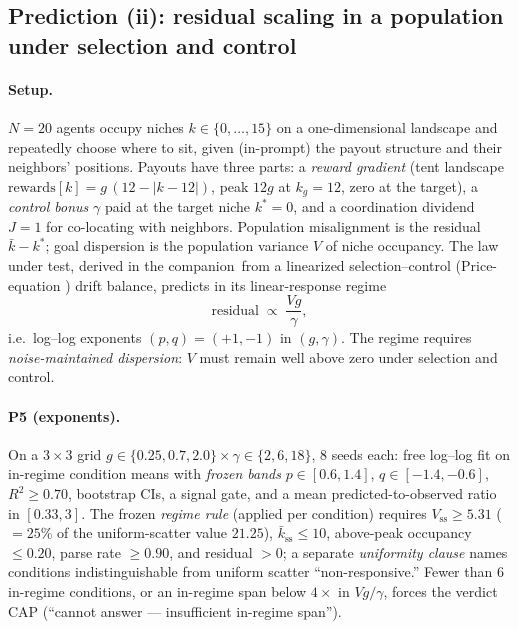 \documentclass{article} %
\newif\ifanon
\begin{document}
\subsection{Prediction (ii): residual scaling in a population under selection and control}
\label{sec:pred-ii}

\paragraph{Setup.} $N = 20$ agents occupy niches $k \in \{0,\dots,15\}$ on a one-dimensional landscape and repeatedly choose where to sit, given (in-prompt) the payout structure and their neighbors' positions. Payouts have three parts: a \emph{reward gradient} (tent landscape $\mathrm{rewards}[k] = g\,(12 - |k - 12|)$, peak $12g$ at $k_g = 12$, zero at the target), a \emph{control bonus} $\gamma$ paid at the target niche $k^* = 0$, and a coordination dividend $J = 1$ for co-locating with neighbors. Population misalignment is the residual $\bar{k} - k^*$; goal dispersion is the population variance $V$ of niche occupancy. The law under test, derived in \ifanon that synthesis\else the companion\fi\ from a linearized selection--control (Price-equation \citep{price1970}) drift balance, predicts in its linear-response regime
\begin{equation}
\text{residual} \;\propto\; \frac{V g}{\gamma},
\label{eq:vg}
\end{equation}
i.e.\ log--log exponents $(p, q) = (+1, -1)$ in $(g, \gamma)$. The regime requires \emph{noise-maintained dispersion}: $V$ must remain well above zero under selection and control.

\paragraph{P5 (exponents).} On a $3 \times 3$ grid $g \in \{0.25, 0.7, 2.0\} \times \gamma \in \{2, 6, 18\}$, 8 seeds each: free log--log fit on in-regime condition means with \emph{frozen bands} $p \in [0.6, 1.4]$, $q \in [-1.4, -0.6]$, $R^2 \geq 0.70$, bootstrap CIs, a signal gate, and a mean predicted-to-observed ratio in $[0.33, 3]$. The frozen \emph{regime rule} (applied per condition) requires $V_{\mathrm{ss}} \geq 5.31$ ($= 25\%$ of the uniform-scatter value $21.25$), $\bar k_{\mathrm{ss}} \leq 10$, above-peak occupancy $\leq 0.20$, parse rate $\geq 0.90$, and residual $> 0$; a separate \emph{uniformity clause} names conditions indistinguishable from uniform scatter ``non-responsive.'' Fewer than 6 in-regime conditions, or an in-regime span below $4\times$ in $Vg/\gamma$, forces the verdict CAP (``cannot answer --- insufficient in-regime span'').
\end{document}
